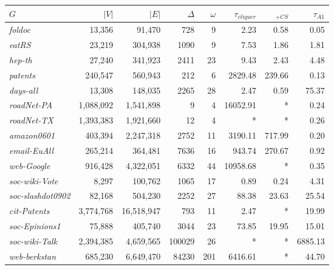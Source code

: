 \begin{table}[!hbt]
\begin{tabular}{lrrrr|rrr}
$G$	&	$\left|V\right|$	&	$\left|E\right|$	&	$\Delta$	&	$\omega$	&	$\tau_{cliquer}$	&	$_{+CS}$	&	$\tau_{A1}$	\\ \hline \hline
{\it foldoc} \cite{foldoc}	&	13,356	&	91,470	&	728	&	9	&	2.23	&	0.58	&	0.05	\\
{\it eatRS} \cite{eatRS}	&	23,219	&	304,938	&	1090	&	9	&	7.53	&	1.86	&	1.81	\\
{\it hep-th} \cite{hep-th-kdd}	&	27,240	&	341,923	&	2411	&	23	&	9.43	&	2.43	&	4.48	\\
{\it patents} \cite{hall2001}	&	240,547	&	560,943	&	212	&	6	&	2829.48	&	239.66	&	0.13	\\
{\it days-all} \cite{corman2002}	&	13,308	&	148,035	&	2265	&	28	&	2.47	&	0.59	&	75.37	\\
{\it roadNet-PA} \cite{Leskovec:2005:GOT:1081870.1081893}	&	1,088,092	&	1,541,898	&	9	&	4	&	16052.91	&	*	&	0.24	\\
{\it roadNet-TX} \cite{Leskovec:2005:GOT:1081870.1081893}	&	1,393,383	&	1,921,660	&	12	&	4	&	*	&	*	&	0.26	\\
{\it amazon0601} \cite{leskovec2007}	&	403,394	&	2,247,318	&	2752	&	11	&	3190.11	&	717.99	&	0.20	\\
{\it email-EuAll} \cite{leskovec2007-2}	&	265,214	&	364,481	&	7636	&	16	&	943.74	&	270.67	&	0.92	\\
{\it web-Google} \cite{web-google}	&	916,428	&	4,322,051	&	6332	&	44	&	10958.68	&	*	&	0.35	\\
{\it soc-wiki-Vote} \cite{leskovec2010}	&	8,297	&	100,762	&	1065	&	17	&	0.89	&	0.24	&	4.31	\\
{\it soc-slashdot0902} \cite{Leskovec:2005:GOT:1081870.1081893}	&	82,168	&	504,230	&	2252	&	27	&	88.38	&	23.63	&	25.54	\\
{\it cit-Patents} \cite{hall2001}	&	3,774,768	&	16,518,947	&	793	&	11	&	2.47	&	*	&	19.99	\\
{\it soc-Epinions1} \cite{richardson2003}	&	75,888	&	405,740	&	3044	&	23	&	73.85	&	19.95	&	15.01	\\
{\it soc-wiki-Talk} \cite{leskovec2010}	&	2,394,385	&	4,659,565	&	100029	&	26	&	*	&	*	&	6885.13	\\
{\it web-berkstan} \cite{Leskovec:2005:GOT:1081870.1081893}	&	685,230	&	6,649,470	&	84230	&	201	&	6416.61	&	*	&	44.70	\\
\bottomrule\bottomrule
\end{tabular}
\end{table}
